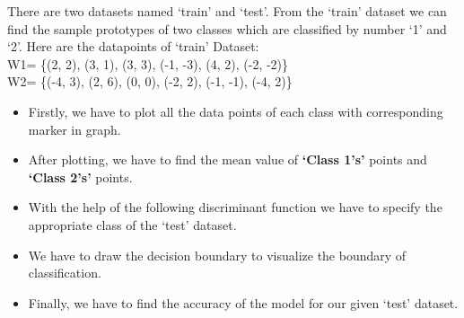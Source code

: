 \documentclass[conference]{IEEEtran}
\begin{document}
There are two datasets named ‘train’ and ‘test’. From the ‘train’ dataset we can find the sample prototypes of two classes which are classified by number ‘1’ and ‘2’. Here are the datapoints of ‘train’ Dataset:\\
	W1= \{(2, 2), (3, 1), (3, 3), (-1, -3), (4, 2), (-2, -2)\}\\
	W2= \{(-4, 3), (2, 6), (0, 0), (-2, 2), (-1, -1), (-4, 2)\}\\
\begin{itemize}  
\item Firstly, we have to plot all the data points of each class with corresponding marker in graph.\\
  \item After plotting, we have to find the mean value of \textbf{‘Class 1’s’} points and \textbf{‘Class 2’s’} points.\\
  \item With the help of the following discriminant function we have to specify the appropriate class of the ‘test’ dataset.\\
 			 
  \item We have to draw the decision boundary to visualize the boundary of classification.\\
  \item Finally, we have to find the accuracy of the model for our given ‘test’ dataset.\\
\end{itemize}
\end{document}
